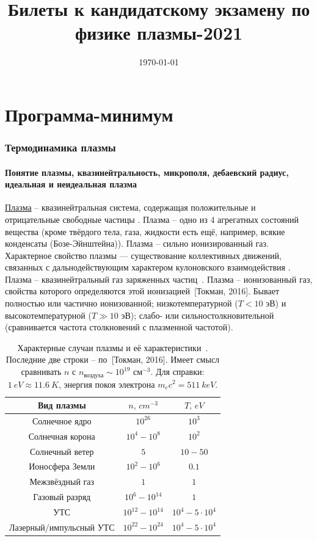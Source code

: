 \documentclass[10pt, a4paper]{article}
\title{Билеты к кандидатскому экзамену по физике плазмы-2021}
\date{\today}
\newcommand{\Tokman}{~[Токман, 2016]}
\let\stdsection\section
\renewcommand\section{\newpage\stdsection}
\let\stdpart\part
\renewcommand{\part}{\newpage\stdpart}
\begin{document}
\maketitle

\tableofcontents

\part{Программа-минимум}

\section{Термодинамика плазмы}

\subsection{Понятие плазмы, квазинейтральность, микрополя, дебаевский радиус, идеальная и неидеальная плазма}

\uline{Плазма} -- квазинейтральная система, содержащая положительные и отрицательные свободные частицы \cite{frank}. Плазма -- одно из 4 агрегатных состояний вещества (кроме твёрдого тела, газа, жидкости есть ещё, например, всякие конденсаты (Бозе-Эйнштейна)). Плазма -- сильно ионизированный газ. Характерное свойство плазмы — существование коллективных
движений, связанных с дальнодействующим характером кулоновского взаимодействия \cite{kroll}. Плазма -- квазинейтральный газ заряженных частиц~\cite{kotelnikov}. Плазма -- ионизованный газ, свойства которого определяются этой ионизацией\Tokman. Бывает полностью или частично ионизованной; низкотемпературной ($T<10$ эВ) и высокотемпературной ($T\gg10$ эВ); слабо- или сильностолкновительной (сравнивается частота столкновений с плазменной частотой).

\begin{table}[ht]
	\caption{Характерные случаи плазмы и её характеристики~\cite{kotelnikov}. Последние две строки -- по\Tokman. Имеет смысл сравнивать $n$ с $n_\text{воздуха} \sim 10^{19}$ см$^{-3}$.	Для справки: $1\ eV \approx 11.6\ K$, энергия покоя электрона $m_e c^2 = 511\ keV$.}
	\begin{center}
		\begin{tabular}{|c|c|c|}
			\hline
			Вид плазмы & $n,\,cm^{-3}$ & $T,\,eV$ \\ \hline
			Солнечное ядро & $10^{26}$ & $10^3$ \\
			Солнечная корона & $10^4-10^8$ & $10^2$ \\
			Солнечный ветер & $5$ & $10-50$ \\
			Ионосфера Земли & $10^2-10^6$ & $0.1$ \\
			Межзвёздный газ & $1$ & $1$ \\
			Газовый разряд & $10^{6}-10^{14}$ & $1$ \\
			УТС & $10^{12}-10^{14}$ & $10^4-5\cdot10^4$ \\
			Лазерный/импульсный УТС & $10^{22}-10^{24}$ & $10^4-5\cdot10^4$ \\
			\hline
		\end{tabular}
	\end{center}
\end{table}
\end{document}
